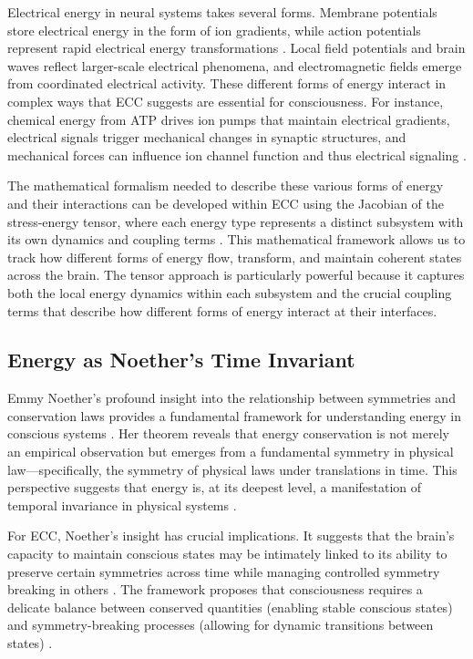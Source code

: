 \begin{refsection}
Electrical energy in neural systems takes several forms. Membrane potentials store electrical energy in the form of ion gradients, while action potentials represent rapid electrical energy transformations \cite{Street2016}. Local field potentials and brain waves reflect larger-scale electrical phenomena, and electromagnetic fields emerge from coordinated electrical activity. These different forms of energy interact in complex ways that ECC suggests are essential for consciousness. For instance, chemical energy from ATP drives ion pumps that maintain electrical gradients, electrical signals trigger mechanical changes in synaptic structures, and mechanical forces can influence ion channel function and thus electrical signaling \cite{Laughlin2005}.

The mathematical formalism needed to describe these various forms of energy and their interactions can be developed within ECC using the Jacobian of the stress-energy tensor, where each energy type represents a distinct subsystem with its own dynamics and coupling terms \cite{Coopersmith2017}. This mathematical framework allows us to track how different forms of energy flow, transform, and maintain coherent states across the brain. The tensor approach is particularly powerful because it captures both the local energy dynamics within each subsystem and the crucial coupling terms that describe how different forms of energy interact at their interfaces.

\subsection{Energy as Noether's Time Invariant}

Emmy Noether's profound insight into the relationship between symmetries and conservation laws provides a fundamental framework for understanding energy in conscious systems \cite{Kosmann-Schwarzbach2011}. Her theorem reveals that energy conservation is not merely an empirical observation but emerges from a fundamental symmetry in physical law—specifically, the symmetry of physical laws under translations in time. This perspective suggests that energy is, at its deepest level, a manifestation of temporal invariance in physical systems \cite{Neuenschwander2017}.

For ECC, Noether's insight has crucial implications. It suggests that the brain's capacity to maintain conscious states may be intimately linked to its ability to preserve certain symmetries across time while managing controlled symmetry breaking in others \cite{Brading2002}. The framework proposes that consciousness requires a delicate balance between conserved quantities (enabling stable conscious states) and symmetry-breaking processes (allowing for dynamic transitions between states) \cite{Weyl1952}.


\end{refsection}
